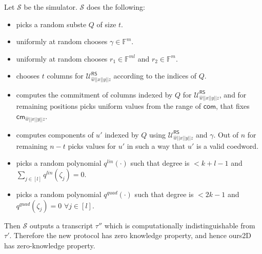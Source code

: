 \documentclass[runningheads]{llncs}
\newcommand{\name}{\textsf{ours}}
\def\sim{\mathcal{S}} %
\def\RS{\mathsf{RS}} %
\def\cm{\mathsf{cm}} %
\def\com{\mathsf{com}} %
\def\extwit{\hat{w}} %
\def\oracle{\mathcal{U}^{\RS}}
\def\bbF{\mathbb{F}}
\begin{document}
	Let $\sim$ be the simulator. $\sim$ does the following:
	\begin{itemize}
		\item  picks a random subste $Q$ of size $t$.
		\item  uniformly at random chooses $\gamma \in \bbF^m$.
		\item  uniformly at random chooses $r_1 \in \bbF^{ml}$ and $r_2 \in \bbF^m$.
		\item  chooses $t$ columns for $\oracle_{\extwit||x||y||z}$ according to the indices of $Q$.
		\item  computes the commitment of columns indexed by $Q$ for $\oracle_{\extwit||x||y||z}$, and for remaining positions picks uniform values from the range of $\com$, that fixes $\cm_{\extwit||x||y||z}$.
		\item  computes components of $u'$ indexed by $Q$ using $\oracle_{\extwit||x||y||z}$ and $\gamma$. Out of $n$ for remaining $n-t$ picks values for $u'$ in such a way that $u'$ is a valid coedword.
		\item  picks a random polynomial $q^{lin}(\cdot)$ such that degree is $<k+l-1$ and $\sum_{j\in [l]} q^{lin}(\zeta_j) = 0$.
		\item  picks a random polynomial $q^{quad}(\cdot)$ such that degree is $<2k-1$ and $q^{quad}(\zeta_j) = 0$ $\forall j\in [l]$.
	\end{itemize} 
	Then $\sim$ outputs a transcript $\tau''$ which is computationally indistinguishable from $\tau'$. Therefore the new protocol has zero knowledge property, and hence \name2D has zero-knowledge property.
	
	
	
\end{document}
